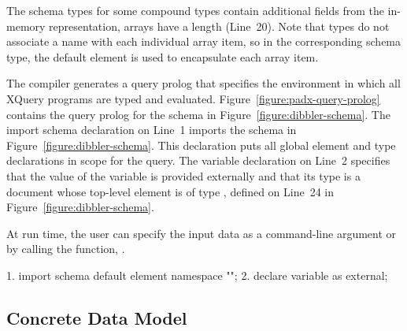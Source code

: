 The schema types for some compound types contain additional fields
from the \pads{} in-memory representation, \eg{} arrays have a length
(Line~20).  Note that  types do not associate a name with
each individual array item, so in the corresponding schema type, the
default element  is used to encapsulate each array item.

The \pads{} compiler generates a query prolog that specifies the
environment in which all XQuery programs are typed and evaluated.
Figure~\ref{figure:padx-query-prolog} contains the query prolog for
the schema in Figure~\ref{figure:dibbler-schema}.  The import schema
declaration on Line~1 imports the schema in
Figure~\ref{figure:dibbler-schema}.  This declaration puts all global
element and type declarations in scope for the query.  The variable
declaration on Line~2 specifies that the value of the variable
 is provided externally and that its type is a document
whose top-level element is of type , defined on Line~24 in
Figure~\ref{figure:dibbler-schema}.

At run time, the user can specify
the input data as a command-line argument or by calling the
 function, \eg{} .
\begin{figure*}
\begin{small}
\begin{code}
 1. import schema default element namespace "";
 2. declare variable  as  external; 
\end{code}
\end{small}
\caption{\padx{} generated query prolog}
\label{figure:padx-query-prolog}
\end{figure*}

\subsection{\padx{} Concrete Data Model}

